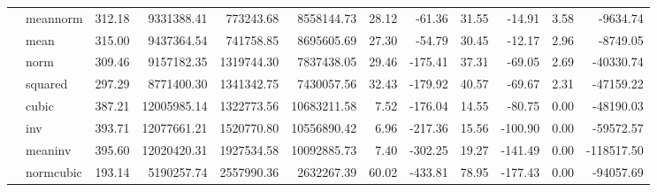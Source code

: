 \begin{tabular}{llrrrrrrrrrr}
 & meannorm & 312.18 & 9331388.41 & 773243.68 & 8558144.73 & 28.12 & -61.36 & 31.55 & -14.91 & 3.58 & -9634.74 \\
 & mean & 315.00 & 9437364.54 & 741758.85 & 8695605.69 & 27.30 & -54.79 & 30.45 & -12.17 & 2.96 & -8749.05 \\
 & norm & 309.46 & 9157182.35 & 1319744.30 & 7837438.05 & 29.46 & -175.41 & 37.31 & -69.05 & 2.69 & -40330.74 \\
 & squared & 297.29 & 8771400.30 & 1341342.75 & 7430057.56 & 32.43 & -179.92 & 40.57 & -69.67 & 2.31 & -47159.22 \\
 & cubic & 387.21 & 12005985.14 & 1322773.56 & 10683211.58 & 7.52 & -176.04 & 14.55 & -80.75 & 0.00 & -48190.03 \\
 & inv & 393.71 & 12077661.21 & 1520770.80 & 10556890.42 & 6.96 & -217.36 & 15.56 & -100.90 & 0.00 & -59572.57 \\
 & meaninv & 395.60 & 12020420.31 & 1927534.58 & 10092885.73 & 7.40 & -302.25 & 19.27 & -141.49 & 0.00 & -118517.50 \\
 & normcubic & 193.14 & 5190257.74 & 2557990.36 & 2632267.39 & 60.02 & -433.81 & 78.95 & -177.43 & 0.00 & -94057.69 \\
\cline{1-12}
\bottomrule
\end{tabular}
